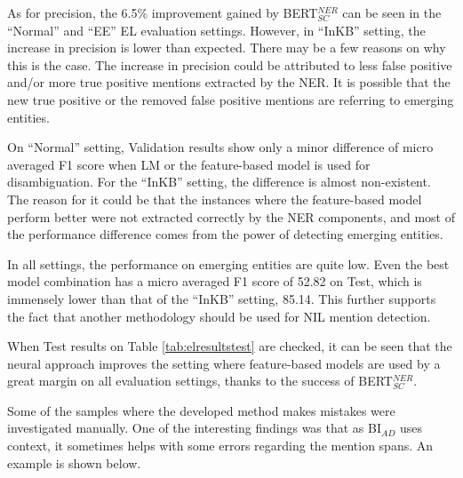 \documentclass{report}
\theoremstyle{definition}
\theoremstyle{remark}
\begin{document}
As for precision, the 6.5\% improvement gained by BERT$_{SC}^{NER}$ can be seen in the ``Normal'' and ``EE'' EL evaluation settings. However, in ``InKB'' setting, the increase in precision is lower than expected. There may be a few reasons on why this is the case. The increase in precision could be attributed to less false positive and/or more true positive mentions extracted by the NER. It is possible that the new true positive or the removed false positive mentions are referring to emerging entities.

On ``Normal'' setting, Validation results show only a minor difference of micro averaged F1 score when LM or the feature-based model is used for disambiguation. For the ``InKB'' setting, the difference is almost non-existent.  The reason for it could be that the instances where the feature-based model perform better were not extracted correctly by the NER components, and most of the performance difference comes from the power of detecting emerging entities.

In all settings, the performance on emerging entities are quite low. Even the best model combination has a micro averaged F1 score of 52.82 on Test, which is immensely lower than that of the ``InKB'' setting, 85.14. This further supports the fact that another methodology should be used for NIL mention detection.

When Test results on Table \ref{tab:elresultstest} are checked, it can be seen that the neural approach improves the setting where feature-based models are used by a great margin on all evaluation settings, thanks to the success of BERT$^{NER}_{SC}$. 

Some of the samples where the developed method makes mistakes were investigated manually. One of the interesting findings was that as BI$_{AD}$ uses context, it sometimes helps with some errors regarding the mention spans. An example is shown below.

\begin{center}
\end{center}
\end{document}
